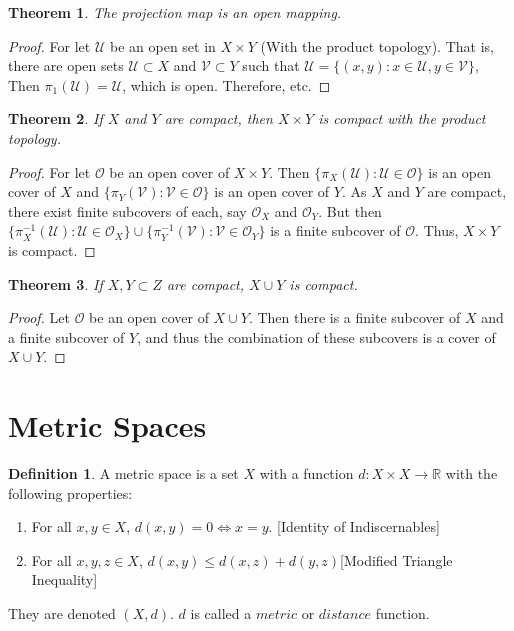 \documentclass[oneside]{book}
\newtheorem{theorem}{Theorem}[section]
\theoremstyle{definition}
\newtheorem{definition}{Definition}[section]
\begin{document}
\begin{theorem}
The projection map is an open mapping.
\end{theorem}
\begin{proof}
For let $\mathscr{U}$ be an open set in $X\times Y$ (With the product topology). That is, there are open sets $\mathcal{U}\subset X$ and $\mathcal{V}\subset Y$ such that $\mathscr{U}= \{(x,y):x\in \mathcal{U},y\in \mathcal{V}\}$, Then $\pi_1(\mathscr{U}) =\mathcal{U}$, which is open. Therefore, etc.
\end{proof}

\begin{theorem}
If $X$ and $Y$ are compact, then $X\times Y$ is compact with the product topology.
\end{theorem}
\begin{proof}
For let $\mathscr{O}$ be an open cover of $X\times Y$. Then $\{\pi_X(\mathscr{U}):\mathscr{U}\in \mathscr{O}\}$ is an open cover of $X$ and $\{\pi_{Y}(\mathscr{V}):\mathscr{V}\in \mathscr{O}\}$ is an open cover of $Y$. As $X$ and $Y$ are compact, there exist finite subcovers of each, say $\mathcal{O}_X$ and $\mathcal{O}_Y$. But then $\{\pi_{X}^{-1}(\mathcal{U}):\mathcal{U}\in \mathcal{O}_X\}\cup \{\pi_{Y}^{-1}(\mathcal{V}):\mathcal{V}\in \mathcal{O}_Y\}$ is a finite subcover of $\mathscr{O}$. Thus, $X\times Y$ is compact.
\end{proof}

\begin{theorem}
If $X,Y\subset Z$ are compact, $X\cup Y$ is compact.
\end{theorem}
\begin{proof}
Let $\mathcal{O}$ be an open cover of $X\cup Y$. Then there is a finite subcover of $X$ and a finite subcover of $Y$, and thus the combination of these subcovers is a cover of $X\cup Y$.
\end{proof}

\section{Metric Spaces}

\begin{definition}
A metric space is a set $X$ with a function $d:X\times X\rightarrow \mathbb{R}$ with the following properties:
\begin{enumerate}
\item For all $x,y\in X$, $d(x,y) = 0\Leftrightarrow x=y$. \hfill [Identity of Indiscernables]
\item For all $x,y,z\in X$, $d(x,y) \leq d(x,z)+d(y,z)$\hfill [Modified Triangle Inequality]
\end{enumerate}
They are denoted $(X,d)$. $d$ is called a $metric$ or $distance$ function.
\end{definition}
\end{document}

